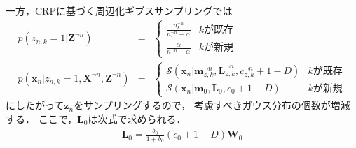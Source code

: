 一方，CRPに基づく周辺化ギブスサンプリングでは
\begin{eqnarray}
p(z_{n,k}=1 | \bm{Z}^{\neg{n}}) 
&=& 
\left\{ \begin{array}{ll}
\frac{n_k^{\neg{n}}}{n_\cdot^{\neg{n}} + \alpha} & k\mbox{が既存} \\
\frac{\alpha}{n_\cdot^{\neg{n}} + \alpha} & k\mbox{が新規}
\end{array} \right.
\\
p(\bm{x}_{n} | z_{n,k}=1, \bm{X}^{\neg{n}}, \bm{Z}^{\neg{n}})
&=& 
\left\{ \begin{array}{ll}
\mathcal{S}\left(\bm{x}_{n}|\bm{m}_{z,k}^{\neg{n}}, 
	    \bm{L}_{z,k}^{\neg{n}}, c_{z,k}^{\neg{n}} + 1 - D \right) & k\mbox{が既存} \\
\mathcal{S}\left(\bm{x}_{n}|\bm{m}_0, 
	    \bm{L}_0, c_0 + 1 - D \right) & k\mbox{が新規}
\end{array} \right.
\end{eqnarray}
にしたがって$\bm{z}_n$をサンプリングするので，
考慮すべきガウス分布の個数が増減する．
ここで，$\bm{L}_0$は次式で求められる．
\begin{eqnarray}
 \bm{L}_0
  = \frac{b_0}{1 + b_0} \left(c_0 + 1 - D\right) \bm{W}_0
\end{eqnarray}
